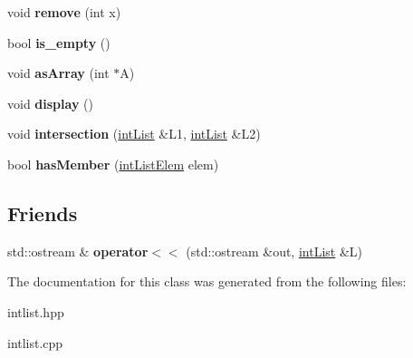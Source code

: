 \begin{DoxyCompactItemize}
\item 
\hypertarget{classintList_a1895a0f39a00b803dbb16aeb67db14a1}{void {\bfseries remove} (int x)}\label{classintList_a1895a0f39a00b803dbb16aeb67db14a1}

\item 
\hypertarget{classintList_a15a8661a560cefd4b0f25b2dc1d31967}{bool {\bfseries is\-\_\-empty} ()}\label{classintList_a15a8661a560cefd4b0f25b2dc1d31967}

\item 
\hypertarget{classintList_a0e044cf0998ad15714cf099d309d9f5c}{void {\bfseries as\-Array} (int $\ast$\-A)}\label{classintList_a0e044cf0998ad15714cf099d309d9f5c}

\item 
\hypertarget{classintList_a9b0c9d0491d4d70cd0ee7a2f163ecd00}{void {\bfseries display} ()}\label{classintList_a9b0c9d0491d4d70cd0ee7a2f163ecd00}

\item 
\hypertarget{classintList_a90d02e436bbb356ac52ca3cbce972cad}{void {\bfseries intersection} (\hyperlink{classintList}{int\-List} \&\-L1, \hyperlink{classintList}{int\-List} \&\-L2)}\label{classintList_a90d02e436bbb356ac52ca3cbce972cad}

\item 
\hypertarget{classintList_a29c98bae589ca7d8b39d2f323a228acc}{bool {\bfseries has\-Member} (\hyperlink{structintListElem}{int\-List\-Elem} elem)}\label{classintList_a29c98bae589ca7d8b39d2f323a228acc}

\end{DoxyCompactItemize}
\subsection*{\-Friends}
\begin{DoxyCompactItemize}
\item 
\hypertarget{classintList_a1296e64c7a174980e611803ffd8f5201}{std\-::ostream \& {\bfseries operator$<$$<$} (std\-::ostream \&out, \hyperlink{classintList}{int\-List} \&\-L)}\label{classintList_a1296e64c7a174980e611803ffd8f5201}

\end{DoxyCompactItemize}


\-The documentation for this class was generated from the following files\-:\begin{DoxyCompactItemize}
\item 
intlist.\-hpp\item 
intlist.\-cpp\end{DoxyCompactItemize}
